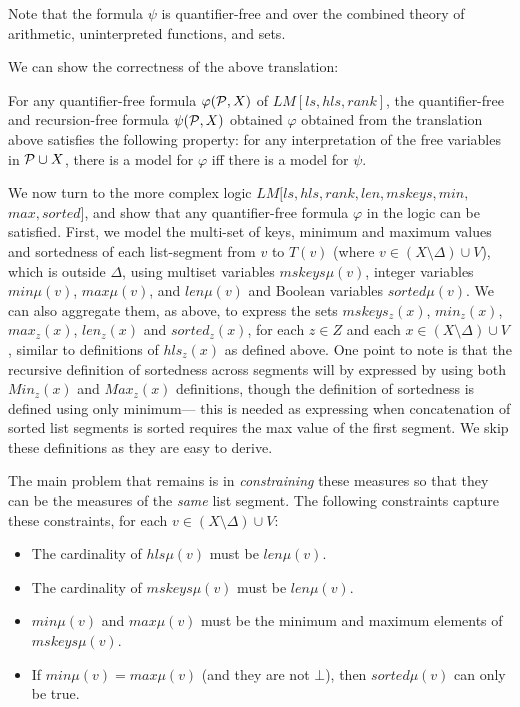 Note that the formula $\psi$ is quantifier-free and over the combined theory of arithmetic, uninterpreted functions, and sets.

We can show the correctness of the above translation:
\begin{theorem}
	For any quantifier-free formula $\varphi({\cal P}, X)$ of $LM[ls,hls,rank]$, the quantifier-free and recursion-free
	 formula $\psi({\cal P}, X)$ obtained $\varphi$ obtained from the translation above
	 satisfies the following property: for any interpretation of the free variables
    in ${\cal P} \cup X$, there is a model for $\varphi$ iff there is a model for $\psi$.
\end{theorem}

\bigskip

We now turn to the more complex logic $LM[ls, hls, rank, len, mskeys, min, $\\$max, sorted]$, and show that
any quantifier-free formula $\varphi$ in the logic can be satisfied. First, we model the multi-set
of keys, minimum and maximum values and sortedness of each list-segment from $v$ to $T(v)$ 
(where $v \in (X \setminus \Delta) \cup V$),
which is outside $\Delta$, using multiset variables $mskeys\mu(v)$, integer variables $min\mu(v)$, $max\mu(v)$,
and $len\mu(v)$ and Boolean variables $sorted\mu(v)$.
We can also aggregate them, as above, to express the sets $mskeys_z(x)$, $min_z(x)$, $max_z(x)$, $len_z(x)$
and $sorted_z(x)$, for each $z \in Z$ and
each $x \in (X \setminus \Delta) \cup V$, similar to definitions of $hls_z(x)$ as defined above.
One point to note is that the recursive definition of sortedness across segments will by expressed
by using both $Min_z(x)$ and $Max_z(x)$ definitions, though the definition of sortedness is defined
using only minimum--- this is needed as expressing when concatenation of sorted list segments is sorted
requires the max value of the first segment. We skip these definitions as they are easy to derive.

The main problem that remains is in \emph{constraining} these measures so that they can be the measures
of the \emph{same} list segment. The following constraints capture these constraints, for each 
$v \in (X \setminus \Delta) \cup V$:
\begin{itemize}
	\item The cardinality of $hls\mu(v)$ must be $len\mu(v)$.
	\item The cardinality of $mskeys\mu(v)$ must be $len\mu(v)$.
	\item $min\mu(v)$ and $max\mu(v)$ must be the minimum and maximum elements of $mskeys\mu(v)$.
	\item If $min\mu(v)=max\mu(v)$ (and they are not $\bot$), then $sorted\mu(v)$ can only be true.
\end{itemize}

